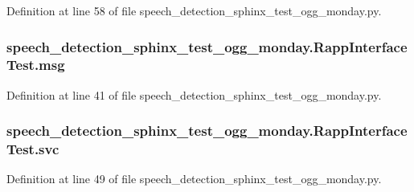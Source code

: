 Definition at line 58 of file speech\-\_\-detection\-\_\-sphinx\-\_\-test\-\_\-ogg\-\_\-monday.\-py.

\hypertarget{classspeech__detection__sphinx__test__ogg__monday_1_1RappInterfaceTest_a5f58a50e17298dbe5a57f5423704f13a}{
\subsubsection[{msg}]{\setlength{\rightskip}{0pt plus 5cm}speech\-\_\-detection\-\_\-sphinx\-\_\-test\-\_\-ogg\-\_\-monday.\-Rapp\-Interface\-Test.\-msg}}\label{classspeech__detection__sphinx__test__ogg__monday_1_1RappInterfaceTest_a5f58a50e17298dbe5a57f5423704f13a}


Definition at line 41 of file speech\-\_\-detection\-\_\-sphinx\-\_\-test\-\_\-ogg\-\_\-monday.\-py.

\hypertarget{classspeech__detection__sphinx__test__ogg__monday_1_1RappInterfaceTest_a07aca31a802a220c656613356688fed6}{
\subsubsection[{svc}]{\setlength{\rightskip}{0pt plus 5cm}speech\-\_\-detection\-\_\-sphinx\-\_\-test\-\_\-ogg\-\_\-monday.\-Rapp\-Interface\-Test.\-svc}}\label{classspeech__detection__sphinx__test__ogg__monday_1_1RappInterfaceTest_a07aca31a802a220c656613356688fed6}


Definition at line 49 of file speech\-\_\-detection\-\_\-sphinx\-\_\-test\-\_\-ogg\-\_\-monday.\-py.

